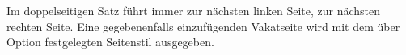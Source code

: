 Im doppelseitigen Satz führt  immer zur nächsten
linken Seite,  zur nächsten
rechten Seite. Eine gegebenenfalls einzufügenden Vakatseite wird mit dem
über Option  festgelegten
Seitenstil ausgegeben.%
%
\EndIndexGroup
%
\EndIndexGroup



